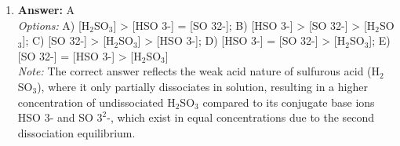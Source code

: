 \documentclass[12pt]{article}
\begin{document}
\begin{enumerate}[label=\arabic*.]
\\ \textit{Options:} A) Bond order of He\_2 is 0 and He\_2^+ is 0.5; B) Bond order of He\_2 is 0.5 and He\_2^+ is 0; C) Bond order of He\_2 and He\_2^+ is 0.5; D) Bond order of He\_2 is 2 and He\_2^+ is 1.5; E) Bond order of He\_2 is 1 and He\_2^+ is 0
\\ \textit{Note:} The bond order is calculated as half the difference between the number of bonding and antibonding electrons, and in He\_2, there are two antibonding electrons and no bonding electrons (yielding a bond order of 0), while in He\_2^+, there is one antibonding electron and two bonding electrons (resulting in a bond order of 0.5).
\item \textbf{Answer:} A
\\ \textit{Options:} A) [H$_{2}$SO$_{3}$] \textgreater{} [HSO 3-] = [SO 32-]; B) [HSO 3-] \textgreater{} [SO 32-] \textgreater{} [H$_{2}$SO$_{3}$]; C) [SO 32-] \textgreater{} [H$_{2}$SO$_{3}$] \textgreater{} [HSO 3-]; D) [HSO 3-] = [SO 32-] \textgreater{} [H$_{2}$SO$_{3}$]; E) [SO 32-] = [HSO 3-] \textgreater{} [H$_{2}$SO$_{3}$]
\\ \textit{Note:} The correct answer reflects the weak acid nature of sulfurous acid (H$_{2}$SO$_{3}$), where it only partially dissociates in solution, resulting in a higher concentration of undissociated H$_{2}$SO$_{3}$ compared to its conjugate base ions HSO 3- and SO $3^2$-, which exist in equal concentrations due to the second dissociation equilibrium.
\end{enumerate}
\end{document}
